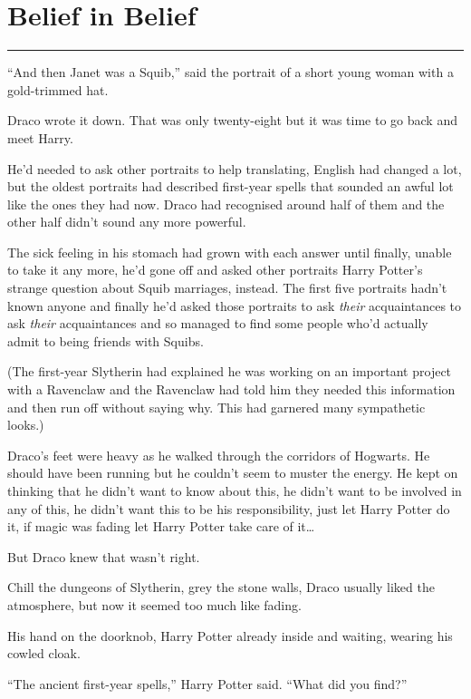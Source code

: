 \chapter{Belief in Belief}\label{belief-in-belief}

\begin{center}\rule{3in}{0.4pt}\end{center}

``And then Janet was a Squib,'' said the portrait of a short young woman
with a gold-trimmed hat.

Draco wrote it down. That was only twenty-eight but it was time to go
back and meet Harry.

He'd needed to ask other portraits to help translating, English had
changed a lot, but the oldest portraits had described first-year spells
that sounded an awful lot like the ones they had now. Draco had
recognised around half of them and the other half didn't sound any more
powerful.

The sick feeling in his stomach had grown with each answer until
finally, unable to take it any more, he'd gone off and asked other
portraits Harry Potter's strange question about Squib marriages,
instead. The first five portraits hadn't known anyone and finally he'd
asked those portraits to ask \emph{their} acquaintances to ask
\emph{their} acquaintances and so managed to find some people who'd
actually admit to being friends with Squibs.

(The first-year Slytherin had explained he was working on an important
project with a Ravenclaw and the Ravenclaw had told him they needed this
information and then run off without saying why. This had garnered many
sympathetic looks.)

Draco's feet were heavy as he walked through the corridors of Hogwarts.
He should have been running but he couldn't seem to muster the energy.
He kept on thinking that he didn't want to know about this, he didn't
want to be involved in any of this, he didn't want this to be his
responsibility, just let Harry Potter do it, if magic was fading let
Harry Potter take care of it\ldots{}

But Draco knew that wasn't right.

Chill the dungeons of Slytherin, grey the stone walls, Draco usually
liked the atmosphere, but now it seemed too much like fading.

His hand on the doorknob, Harry Potter already inside and waiting,
wearing his cowled cloak.

``The ancient first-year spells,'' Harry Potter said. ``What did you
find?''


